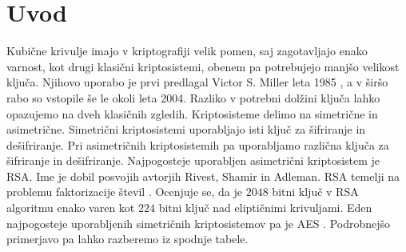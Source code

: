 \documentclass[12pt,a4paper,twoside]{article}
\theoremstyle{definition} %
\theoremstyle{plain} %
\numberwithin{equation}{section}  %
\begin{document}
\section{Uvod}
Kubične krivulje imajo v kriptografiji velik pomen, saj zagotavljajo enako varnost, kot drugi klasični kriptosistemi, obenem pa potrebujejo manjšo velikost ključa. Njihovo uporabo je prvi predlagal Victor S. Miller leta 1985 \cite{Miller}, a v širšo rabo so vstopile še le okoli leta 2004. Razliko v potrebni dolžini ključa lahko opazujemo na dveh klasičnih zgledih. Kriptosisteme delimo na simetrične in asimetrične. Simetrični kriptosistemi uporabljajo isti ključ za šifriranje in dešifriranje. Pri asimetričnih kriptosistemih pa uporabljamo različna ključa za šifriranje in dešifriranje. Najpogosteje uporabljen asimetrični kriptosistem je RSA. Ime je dobil posvojih avtorjih Rivest, Shamir in Adleman. RSA temelji na problemu faktorizacije števil \cite{Easttom2015}. Ocenjuje se, da je $2048$ bitni ključ v RSA algoritmu enako varen kot $224$ bitni ključ nad eliptičnimi krivuljami.
Eden najpogosteje uporabljenih simetričnih kriptosistemov pa je AES \cite{Easttom2015}. Podrobnejšo primerjavo pa lahko razberemo iz spodnje tabele.
\end{document}
